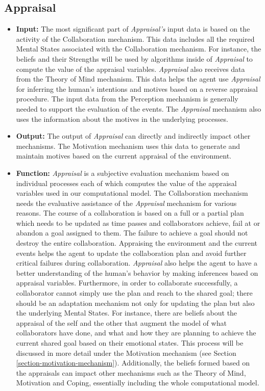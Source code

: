 \documentclass[12pt]{report}
\begin{document}
\subsection{Appraisal}

\begin{itemize}
  \item \textbf{Input:} The most significant part of \textit{Appraisal's} input
  data is based on the activity of the Collaboration mechanism. This data
  includes all the required Mental States associated with the Collaboration
  mechanism. For instance, the beliefs and their Strengths will be used by
  algorithms inside of \textit{Appraisal} to compute the value of the appraisal
  variables. \textit{Appraisal} also receives data from the Theory of Mind
  mechanism. This data helps the agent use \textit{Appraisal} for inferring
  the human's intentions and motives based on a reverse appraisal procedure.
  The input data from the Perception mechanism is generally needed to support
  the evaluation of the events. The \textit{Appraisal} mechanism also uses the
  information about the motives in the underlying processes.
   
  \item \textbf{Output:} The output of \textit{Appraisal} can directly and
  indirectly impact other mechanisms. The Motivation mechanism uses this data to
  generate and maintain motives based on the current appraisal of the
  environment.
  
  \item \textbf{Function:} \textit{Appraisal} is a subjective evaluation
  mechanism based on individual processes each of which computes the value of
  the appraisal variables used in our computational model. The Collaboration
  mechanism needs the evaluative assistance of the \textit{Appraisal} mechanism
  for various reasons. The course of a collaboration is based on a full or a
  partial plan which needs to be updated as time passes and collaborators
  achieve, fail at or abandon a goal assigned to them. The failure to achieve a
  goal should not destroy the entire collaboration. Appraising the environment
  and the current events helps the agent to update the collaboration plan and
  avoid further critical failures during collaboration.  \textit{Appraisal}
  also helps the agent to have a better understanding of the human's behavior by
  making inferences based on appraisal variables. Furthermore, in order to
  collaborate successfully, a collaborator cannot simply use the plan and reach
  to the shared goal; there should be an adaptation mechanism not only for
  updating the plan but also the underlying Mental States. For instance, there
  are beliefs about the appraisal of the self and the other that augment the
  model of what collaborators have done, and what and how they are planning to
  achieve the current shared goal based on their emotional states. This process
  will be discussed in more detail under the Motivation mechanism (see Section
  \ref{section-motivation-mechanism}). Additionally, the beliefs formed based on
  the appraisals can impact other mechanisms such as the Theory of Mind,
  Motivation and Coping, essentially including the whole computational model.
\end{itemize}
\end{document}
